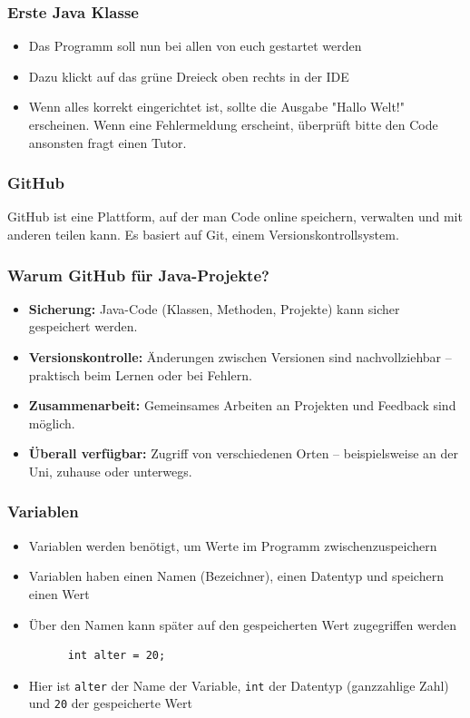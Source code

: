 \documentclass{../../presentation}
\begin{document}
\begin{frame}
  \frametitle{Erste Java Klasse}
  \begin{itemize}
    \item Das Programm soll nun bei allen von euch gestartet werden
    \item Dazu klickt auf das grüne Dreieck oben rechts in der IDE
    \item Wenn alles korrekt eingerichtet ist, sollte die Ausgabe "Hallo Welt!" erscheinen.
          \achtung{} Wenn eine Fehlermeldung erscheint, überprüft bitte den Code ansonsten fragt einen Tutor.
  \end{itemize}
\end{frame}

\begin{frame}
  \frametitle{GitHub}
  GitHub ist eine Plattform, auf der man Code online speichern, verwalten und mit anderen teilen kann. Es basiert auf Git, einem Versionskontrollsystem.
\end{frame}

\begin{frame}
  \frametitle{Warum GitHub für Java-Projekte?}
  \pause
  \begin{itemize}
    \item \textbf{Sicherung:} Java-Code (Klassen, Methoden, Projekte) kann sicher gespeichert werden.
          \pause
    \item \textbf{Versionskontrolle:} Änderungen zwischen Versionen sind nachvollziehbar – praktisch beim Lernen oder bei Fehlern.
          \pause
    \item \textbf{Zusammenarbeit:} Gemeinsames Arbeiten an Projekten und Feedback sind möglich.
          \pause
    \item \textbf{Überall verfügbar:} Zugriff von verschiedenen Orten – beispielsweise an der Uni, zuhause oder unterwegs.
  \end{itemize}
\end{frame}

\begin{frame}[fragile]
  \frametitle{Variablen}
  \pause
  \begin{itemize}
    \item Variablen werden benötigt, um Werte im Programm zwischenzuspeichern
    \item Variablen haben einen Namen (Bezeichner), einen Datentyp und speichern einen Wert
    \item Über den Namen kann später auf den gespeicherten Wert zugegriffen werden
          \pause
          \begin{verbatim}
      int alter = 20;
    \end{verbatim}
    \item Hier ist \texttt{alter} der Name der Variable, \texttt{int} der Datentyp (ganzzahlige Zahl) und \texttt{20} der gespeicherte Wert
  \end{itemize}
\end{frame}
\end{document}
